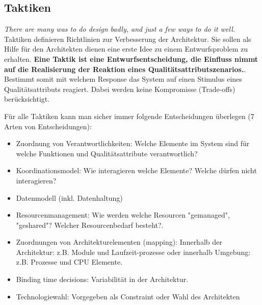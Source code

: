 \subsection{Taktiken}
\emph{There are many was to do design badly, and just a few ways to do it well.} Taktiken definieren Richtlinien zur Verbesserung der Architektur. Sie sollen als Hilfe für den Architekten dienen eine erste Idee zu einem Entwurfsproblem zu erhalten. \textbf{Eine Taktik ist eine Entwurfsentscheidung, die Einfluss nimmt auf die Realisierung der Reaktion eines Qualitätsattributszenarios.}. Bestimmt somit mit welchem Response das System auf einen Stimulus eines Qualitätsattributs reagiert. Dabei werden keine Kompromisse (Trade-offs) berücksichtigt.

Für alle Taktiken kann man sicher immer folgende Entscheidungen überlegen (7 Arten von Entscheidungen):
\begin{itemize}
	\item Zuordnung von Verantwortlichkeiten: Welche Elemente im System sind für welche Funktionen und Qualitätsattribute verantwortlich?
	\item Koordinationsmodel: Wie interagieren welche Elemente? Welche dürfen nicht interagieren?
	\item Datenmodell (inkl. Datenhaltung)
	\item Resourcenmanagement: Wie werden welche Resourcen "gemanaged", "geshared"? Welcher Resourcenbedarf besteht?.
	\item Zuordnungen von Architekturelementen (mapping): Innerhalb der Architektur: z.B. Module und Laufzeit-prozesse oder innerhalb Umgebung: z.B. Prozesse und CPU Elemente.
	\item Binding time decisions: Variabilität in der Architektur.
	\item Technologiewahl: Vorgegeben als Constraint oder Wahl des Architekten
\end{itemize}

